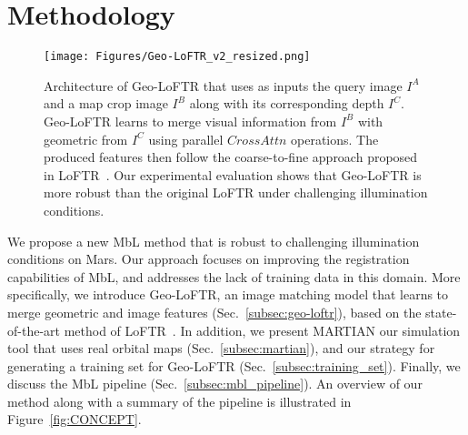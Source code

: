 \section{Methodology}
\label{sec:methodology}


\begin{figure}
    \centering
    \texttt{[image: Figures/Geo-LoFTR\_v2\_resized.png]}
    \caption{Architecture of Geo-LoFTR that uses as inputs the query image $I^A$ and a map crop image $I^B$ along with its corresponding depth $I^C$. Geo-LoFTR learns to merge visual information from $I^B$ with geometric from $I^C$ using parallel $CrossAttn$ operations. The produced features then follow the coarse-to-fine approach proposed in LoFTR~\cite{loftr}. Our experimental evaluation shows that Geo-LoFTR is more robust than the original LoFTR under challenging illumination conditions.}
    \label{fig:geo-loftr}
\end{figure}


We propose a new MbL method that is robust to challenging illumination conditions on Mars. Our approach focuses on improving the registration capabilities of MbL, and addresses the lack of training data in this domain. More specifically, we introduce Geo-LoFTR, an image matching model that learns to merge geometric and image features (Sec.~\ref{subsec:geo-loftr}), based on the state-of-the-art method of LoFTR~\cite{loftr}. In addition, we present MARTIAN our simulation tool that uses real orbital maps (Sec.~\ref{subsec:martian}), and our strategy for generating a training set for Geo-LoFTR (Sec.~\ref{subsec:training_set}). Finally, we discuss the MbL pipeline (Sec.~\ref{subsec:mbl_pipeline}).
An overview of our method along with a summary of the pipeline is illustrated in Figure~\ref{fig:CONCEPT}.



